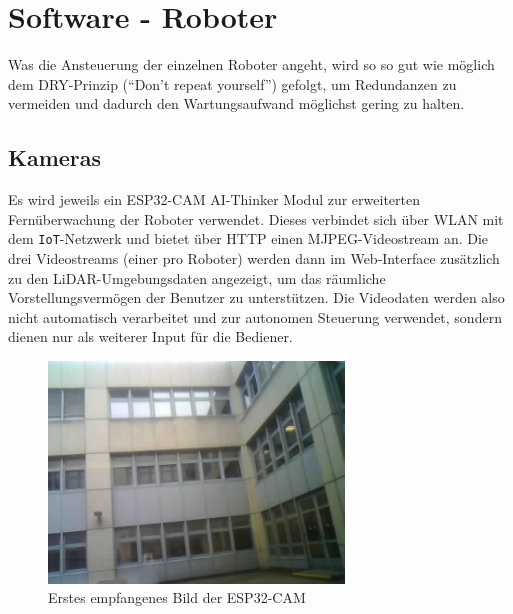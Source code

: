 
\chapter{Software - Roboter}
\label{sec:software_robots}
Was die Ansteuerung der einzelnen Roboter angeht,
wird so so gut wie möglich dem DRY-Prinzip (``Don't repeat yourself'') gefolgt,
um Redundanzen zu vermeiden und dadurch den Wartungsaufwand möglichst gering zu halten.

\section{Kameras}
\label{subsec:robots_cams}
Es wird jeweils ein ESP32-CAM AI-Thinker Modul zur erweiterten
Fernüberwachung der Roboter verwendet.
%
Dieses verbindet sich über WLAN mit dem \texttt{IoT}-Netzwerk und bietet über HTTP einen MJPEG-Videostream an.
%
Die drei Videostreams (einer pro Roboter) werden dann im Web-Interface
zusätzlich zu den LiDAR-Umgebungsdaten angezeigt,
um das räumliche Vorstellungsvermögen der Benutzer zu unterstützen.
%
Die Videodaten werden also nicht automatisch verarbeitet und zur autonomen Steuerung verwendet,
sondern dienen nur als weiterer Input für die Bediener.
\begin{figure}[H]
    \includegraphics[width=0.7\textwidth, center]{img/cam_erstes_bild.png}
    \caption{Erstes empfangenes Bild der ESP32-CAM}
    \label{fig:cam_erstes_bild}
\end{figure}

